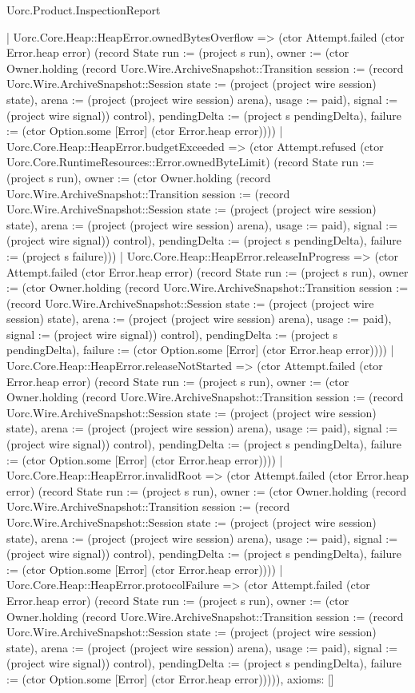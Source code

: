 \begin{lexlean}{Uorc.Product.InspectionReport}
\begin{semanticmodule}
{    | Uorc.Core.Heap::HeapError.ownedBytesOverflow => (ctor Attempt.failed (ctor Error.heap error) (record State {run := (project s run), owner := (ctor Owner.holding (record Uorc.Wire.ArchiveSnapshot::Transition {session := (record Uorc.Wire.ArchiveSnapshot::Session {state := (project (project wire session) state), arena := (project (project wire session) arena), usage := paid}), signal := (project wire signal)}) control), pendingDelta := (project s pendingDelta), failure := (ctor Option.some [Error] (ctor Error.heap error))}))
    | Uorc.Core.Heap::HeapError.budgetExceeded => (ctor Attempt.refused (ctor Uorc.Core.RuntimeResources::Error.ownedByteLimit) (record State {run := (project s run), owner := (ctor Owner.holding (record Uorc.Wire.ArchiveSnapshot::Transition {session := (record Uorc.Wire.ArchiveSnapshot::Session {state := (project (project wire session) state), arena := (project (project wire session) arena), usage := paid}), signal := (project wire signal)}) control), pendingDelta := (project s pendingDelta), failure := (project s failure)}))
    | Uorc.Core.Heap::HeapError.releaseInProgress => (ctor Attempt.failed (ctor Error.heap error) (record State {run := (project s run), owner := (ctor Owner.holding (record Uorc.Wire.ArchiveSnapshot::Transition {session := (record Uorc.Wire.ArchiveSnapshot::Session {state := (project (project wire session) state), arena := (project (project wire session) arena), usage := paid}), signal := (project wire signal)}) control), pendingDelta := (project s pendingDelta), failure := (ctor Option.some [Error] (ctor Error.heap error))}))
    | Uorc.Core.Heap::HeapError.releaseNotStarted => (ctor Attempt.failed (ctor Error.heap error) (record State {run := (project s run), owner := (ctor Owner.holding (record Uorc.Wire.ArchiveSnapshot::Transition {session := (record Uorc.Wire.ArchiveSnapshot::Session {state := (project (project wire session) state), arena := (project (project wire session) arena), usage := paid}), signal := (project wire signal)}) control), pendingDelta := (project s pendingDelta), failure := (ctor Option.some [Error] (ctor Error.heap error))}))
    | Uorc.Core.Heap::HeapError.invalidRoot => (ctor Attempt.failed (ctor Error.heap error) (record State {run := (project s run), owner := (ctor Owner.holding (record Uorc.Wire.ArchiveSnapshot::Transition {session := (record Uorc.Wire.ArchiveSnapshot::Session {state := (project (project wire session) state), arena := (project (project wire session) arena), usage := paid}), signal := (project wire signal)}) control), pendingDelta := (project s pendingDelta), failure := (ctor Option.some [Error] (ctor Error.heap error))}))
    | Uorc.Core.Heap::HeapError.protocolFailure => (ctor Attempt.failed (ctor Error.heap error) (record State {run := (project s run), owner := (ctor Owner.holding (record Uorc.Wire.ArchiveSnapshot::Transition {session := (record Uorc.Wire.ArchiveSnapshot::Session {state := (project (project wire session) state), arena := (project (project wire session) arena), usage := paid}), signal := (project wire signal)}) control), pendingDelta := (project s pendingDelta), failure := (ctor Option.some [Error] (ctor Error.heap error))}))),
  axioms: []
}


\end{semanticmodule}
\end{lexlean}
